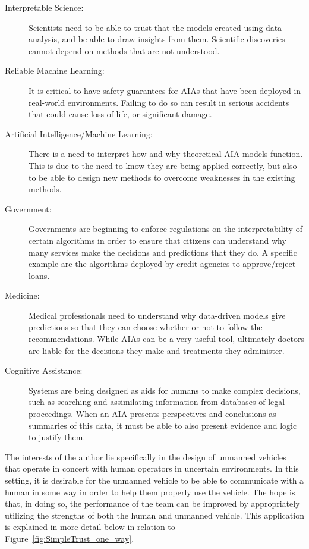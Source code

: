     \begin{description}
        \item [Interpretable Science:] Scientists need to be able to trust that the models created using data analysis, and be able to draw insights from them. Scientific discoveries cannot depend on methods that are not understood.
        \item [Reliable Machine Learning:] It is critical to have safety guarantees for AIAs that have been deployed in real-world environments. Failing to do so can result in serious accidents that could cause loss of life, or significant damage.
        \item [Artificial Intelligence/Machine Learning:] There is a need to interpret how and why theoretical AIA models function. This is due to the need to know they are being applied correctly, but also to be able to design new methods to overcome weaknesses in the existing methods.
        \item [Government:] Governments are beginning to enforce regulations on the interpretability of certain algorithms in order to ensure that citizens can understand why many services make the decisions and predictions that they do. A specific example are the algorithms deployed by credit agencies to approve/reject loans.
        \item [Medicine:] Medical professionals need to understand why data-driven models give predictions so that they can choose whether or not to follow the recommendations. While AIAs can be a very useful tool, ultimately doctors are liable for the decisions they make and treatments they administer.
        \item [Cognitive Assistance:] Systems are being designed as aids for humans to make complex decisions, such as searching and assimilating information from databases of legal proceedings. When an AIA presents perspectives and conclusions as summaries of this data, it must be able to also present evidence and logic to justify them.
    \end{description}

    The interests of the author lie specifically in the design of unmanned vehicles that operate in concert with human operators in uncertain environments. In this setting, it is desirable for the unmanned vehicle to be able to communicate with a human in some way in order to help them properly use the vehicle. The hope is that, in doing so, the performance of the team can be improved by appropriately utilizing the strengths of both the human and unmanned vehicle. This application is explained in more detail below in relation to Figure~\ref{fig:SimpleTrust_one_way}.

